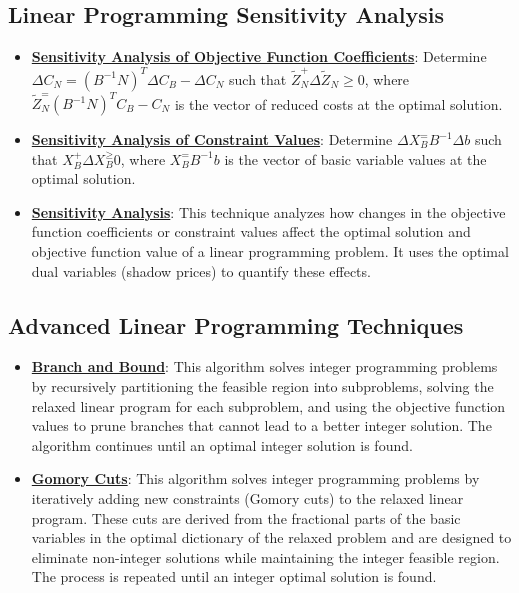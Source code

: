 \documentclass{article}%
\begin{document}
\subsection{Linear Programming Sensitivity Analysis}%
\label{subsec:LinearProgrammingSensitivityAnalysis}%
\begin{itemize}[leftmargin=*]%
\item \href{https://www.math.purdue.edu/~yipn/421/2024-09-26-Sensitivity.pdf#page=7}{\textbf{Sensitivity Analysis of Objective Function Coefficients}}: Determine $\Delta C_N = (B^{-1}N)^T\Delta C_B - \Delta C_N$ such that $\tilde{Z}_N^ + \Delta \tilde{Z}_N \ge 0$, where $\tilde{Z}_N^ = (B^{-1}N)^TC_B - C_N$ is the vector of reduced costs at the optimal solution.%
\item \href{https://www.math.purdue.edu/~yipn/421/2024-09-26-Sensitivity.pdf#page=11}{\textbf{Sensitivity Analysis of Constraint Values}}: Determine $\Delta X_B^ = B^{-1}\Delta b$ such that $X_B^ + \Delta X_B^ \ge 0$, where $X_B^ = B^{-1}b$ is the vector of basic variable values at the optimal solution.%
\item \href{https://www.math.purdue.edu/~yipn/421/2024-10-01-SensitivityDuality.pdf#page=7}{\textbf{Sensitivity Analysis}}: This technique analyzes how changes in the objective function coefficients or constraint values affect the optimal solution and objective function value of a linear programming problem. It uses the optimal dual variables (shadow prices) to quantify these effects.%
\end{itemize}

%
\subsection{Advanced Linear Programming Techniques}%
\label{subsec:AdvancedLinearProgrammingTechniques}%
\begin{itemize}[leftmargin=*]%
\item \href{https://www.math.purdue.edu/~yipn/421/2024-10-31-IntLinProg.pdf#page=5}{\textbf{Branch and Bound}}: This algorithm solves integer programming problems by recursively partitioning the feasible region into subproblems, solving the relaxed linear program for each subproblem, and using the objective function values to prune branches that cannot lead to a better integer solution. The algorithm continues until an optimal integer solution is found.%
\item \href{https://www.math.purdue.edu/~yipn/421/2024-10-31-IntLinProg.pdf#page=15}{\textbf{Gomory Cuts}}: This algorithm solves integer programming problems by iteratively adding new constraints (Gomory cuts) to the relaxed linear program. These cuts are derived from the fractional parts of the basic variables in the optimal dictionary of the relaxed problem and are designed to eliminate non-integer solutions while maintaining the integer feasible region. The process is repeated until an integer optimal solution is found.%
\end{itemize}
\end{document}
